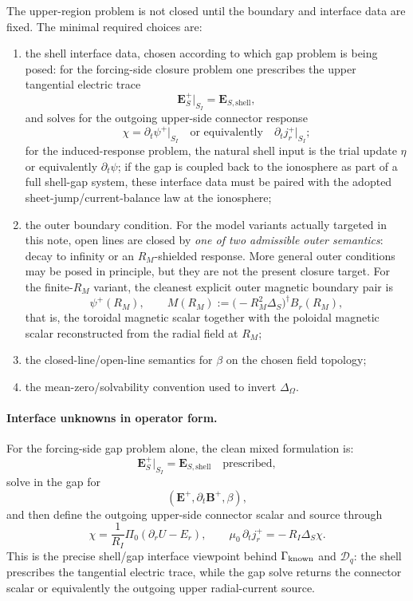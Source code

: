 \documentclass[11pt,a4paper]{article}
\begin{document}
The upper-region problem is not closed until the boundary and interface data
are fixed. The minimal required choices are:
\begin{enumerate}
\item the shell interface data, chosen according to which gap problem is being
posed: for the forcing-side closure problem one prescribes the upper
tangential electric trace
\[
\mathbf E_S^+\big|_{S_I}=\mathbf E_{S,\mathrm{shell}},
\]
and solves for the outgoing upper-side connector response
\[
\chi=\partial_t\psi^+\big|_{S_I}
\quad\text{or equivalently}\quad
\partial_t j_r^+\big|_{S_I};
\]
for the induced-response problem, the natural shell input is the trial update
\(\eta\) or equivalently \(\partial_t\psi\); if the gap is coupled back to the
ionosphere as part of a full shell-gap system, these interface data must be
paired with the adopted sheet-jump/current-balance law at the ionosphere;
\item the outer boundary condition. For the model variants actually targeted in
this note, open lines are closed by \emph{one of two admissible outer
semantics}: decay to infinity or an \(R_M\)-shielded response. More general
outer conditions may be posed in principle, but they are not the present
closure target. For the finite-\(R_M\) variant, the cleanest explicit outer
magnetic boundary pair is
\[
\psi^+(R_M),
\qquad
M(R_M):=\bigl(-R_M^2\Delta_S\bigr)^\dagger B_r(R_M),
\]
that is, the toroidal magnetic scalar together with the poloidal magnetic
scalar reconstructed from the radial field at \(R_M\);
\item the closed-line/open-line semantics for \(\beta\) on the chosen field
topology;
\item the mean-zero/solvability convention used to invert
\(\Delta_\Omega\).
\end{enumerate}

\paragraph{Interface unknowns in operator form.}
For the forcing-side gap problem alone, the clean mixed formulation is:
\[
\mathbf E_S^+\big|_{S_I}=\mathbf E_{S,\mathrm{shell}}
\quad\text{prescribed},
\]
solve in the gap for
\[
(\mathbf E^+,\partial_t\mathbf B^+,\beta),
\]
and then define the outgoing upper-side connector scalar and source through
\[
\chi=\frac{1}{R_I}\Pi_0(\partial_r U-E_r),
\qquad
\mu_0\,\partial_t j_r^+ = -\,R_I\Delta_S\chi.
\]
This is the precise shell/gap interface viewpoint behind
\(\Gamma_{\rm known}\) and \(\mathcal D_q\): the shell prescribes the
tangential electric trace, while the gap solve returns the connector scalar or
equivalently the outgoing upper radial-current source.
\end{document}
